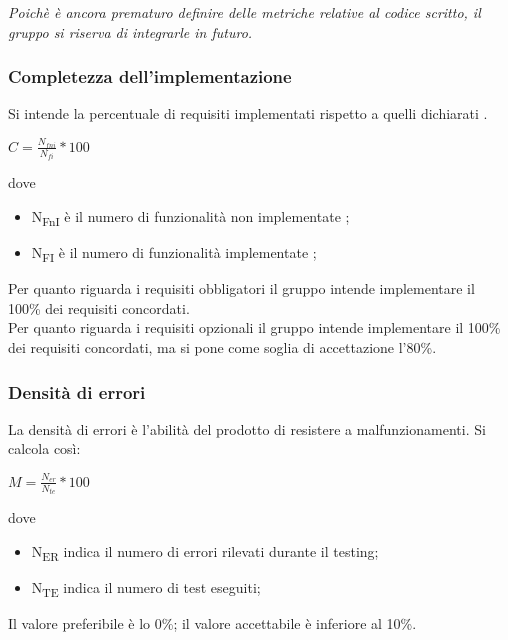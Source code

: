\documentclass[../piano_di_qualifica.tex]{subfiles}
\begin{document}
\emph{Poichè è ancora prematuro definire delle metriche relative al codice scritto, il gruppo si riserva di integrarle in futuro.}

\subsubsection{Completezza dell'implementazione}
Si intende la percentuale di requisiti implementati rispetto a quelli dichiarati .

\begin{center}
	$C = \frac{N_{fni}}{N_{fi}} * 100$
\end{center}



dove
\begin{itemize}
\item N\textsubscript{FnI} è il numero di funzionalità non implementate ;
\item N\textsubscript{FI} è il numero di funzionalità implementate ;
\end{itemize}

Per quanto riguarda i requisiti obbligatori il gruppo intende implementare il 100\% dei requisiti concordati. \\
Per quanto riguarda i requisiti opzionali il gruppo intende implementare il 100\% dei requisiti concordati, ma si pone come soglia di accettazione l’80\%. 

\subsubsection{Densità di errori}
La densità di errori è l'abilità del prodotto di resistere a malfunzionamenti. Si calcola così:\par

\begin{center}
	$M = \frac{N_{er}}{N_{te}} * 100$
\end{center}



dove
\begin{itemize}
\item N\textsubscript{ER} indica il numero di errori rilevati durante il testing;
\item N\textsubscript{TE} indica il numero di test eseguiti;
\end{itemize}

Il valore preferibile è lo 0\%; il valore accettabile è inferiore al 10\%.
\end{document}
